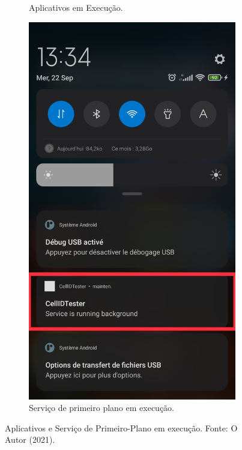 \documentclass[12pt, a4paper]{article}
\begin{document}
\begin{figure}[!ht]
\begin{subfigure}{0.3\textwidth}
            \caption{Aplicativos em Execução.}
            \label{fig:recent_apps}
        \end{subfigure}
        \hfill
        \begin{subfigure}{0.3\textwidth}
            \includegraphics[width=\textwidth,height=0.3\textheight,keepaspectratio]{foreground_service.jpg}
            \caption{Serviço de primeiro plano em execução.}
            \label{fig:foreground_services}
        \end{subfigure}
        \hfill
        \caption{Aplicativos e Serviço de Primeiro-Plano em execução. Fonte: O Autor (2021).}
        \label{fig:user}
    \end{figure}
    
\end{document}
